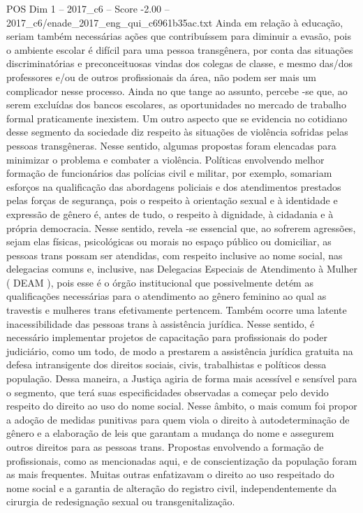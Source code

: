\begin{textsample}{POS Dim 1 – 2017\_c6 – Score -2.00 – 2017\_c6/enade\_2017\_eng\_qui\_c6961b35ac.txt}
Ainda em relação à educação, seriam também necessárias ações que contribuíssem para diminuir a evasão, pois o ambiente escolar é difícil para uma pessoa transgênera, por conta das situações discriminatórias e preconceituosas vindas dos colegas de classe, e mesmo das/dos professores e/ou de outros profissionais da área, não podem ser mais um complicador nesse processo.
Ainda no que tange ao assunto, percebe -se que, ao serem excluídas dos bancos escolares, as oportunidades no mercado de trabalho formal praticamente inexistem.
Um outro aspecto que se evidencia no cotidiano desse segmento da sociedade diz respeito às situações de violência sofridas pelas pessoas transgêneras.
Nesse sentido, algumas propostas foram elencadas para minimizar o problema e combater a violência.
Políticas envolvendo melhor formação de funcionários das polícias civil e militar, por exemplo, somariam esforços na qualificação das abordagens policiais e dos atendimentos prestados pelas forças de segurança, pois o respeito à orientação sexual e à identidade e expressão de gênero é, antes de tudo, o respeito à dignidade, à cidadania e à própria democracia.
Nesse sentido, revela -se essencial que, ao sofrerem agressões, sejam elas físicas, psicológicas ou morais no espaço público ou domiciliar, as pessoas trans possam ser atendidas, com respeito inclusive ao nome social, nas delegacias comuns e, inclusive, nas Delegacias Especiais de Atendimento à Mulher ( DEAM ), pois esse é o órgão institucional que possivelmente detém as qualificações necessárias para o atendimento ao gênero feminino ao qual as travestis e mulheres trans efetivamente pertencem.
Também ocorre uma latente inacessibilidade das pessoas trans à assistência jurídica.
Nesse sentido, é necessário implementar projetos de capacitação para profissionais do poder judiciário, como um todo, de modo a prestarem a assistência jurídica gratuita na defesa intransigente dos direitos sociais, civis, trabalhistas e políticos dessa população.
Dessa maneira, a Justiça agiria de forma mais acessível e sensível para o segmento, que terá suas especificidades observadas a começar pelo devido respeito do direito ao uso do nome social.
Nesse âmbito, o mais comum foi propor a adoção de medidas punitivas para quem viola o direito à autodeterminação de gênero e a elaboração de leis que garantam a mudança do nome e assegurem outros direitos para as pessoas trans.
Propostas envolvendo a formação de profissionais, como as mencionadas aqui, e de conscientização da população foram as mais frequentes.
Muitas outras enfatizavam o direito ao uso respeitado do nome social e a garantia de alteração do registro civil, independentemente da cirurgia de redesignação sexual ou transgenitalização.

\end{textsample}
